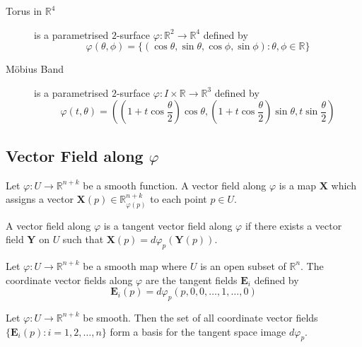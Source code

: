 \begin{description}
	\item[Torus in $\mathbb{R}^4$] is a parametrised $2$-surface $\varphi : \mathbb{R}^2 \to \mathbb{R}^4$ defined by
	\begin{equation}
		\varphi(\theta,\phi) = \{ (\cos \theta,\sin \theta,\cos \phi,\sin \phi) : \theta,\phi \in \mathbb{R} \}
	\end{equation}
\item[M\"obius Band] is a parametrised $2$-surface $\varphi : I \times \mathbb{R} \to \mathbb{R}^3$ defined by
	\begin{equation}
		\varphi(t,\theta) = \left( \left(1+t \cos \frac{\theta}{2}\right)\cos \theta, \left( 1+t \cos \frac{\theta}{2}\right) \sin \theta, t \sin\frac{\theta}{2} \right)
	\end{equation}
\end{description}

\subsection{Vector Field along $\varphi$}
\begin{definition}
	Let $\varphi : U \to \mathbb{R}^{n+k}$ be a smooth function.
	A vector field along $\varphi$ is a map $\mathbf{X}$ which assigns a vector $\mathbf{X}(p) \in \mathbb{R}_{\varphi(p)}^{n+k}$ to each point $p \in U$.
\end{definition}

\begin{definition}
	A vector field along $\varphi$ is a tangent vector field along $\varphi$ if there exists a vector field $\mathbf{Y}$ on $U$ such that $\mathbf{X}(p) = d\varphi_p(\mathbf{Y}(p))$.
\end{definition}

\begin{definition}
	Let $\varphi : U \to \mathbb{R}^{n+k}$ be a smooth map where $U$ is an open subset of $\mathbb{R}^n$.
	The coordinate vector fields along $\varphi$ are the tangent fields $\mathbf{E}_i$ defined by
	\begin{equation}
		\mathbf{E}_i(p) = d\varphi_p(p,0,0,\dots,1,\dots,0)
	\end{equation}
\end{definition}

\begin{theorem}
	Let $\varphi : U \to \mathbb{R}^{n+k}$ be smooth.
	Then the set of all coordinate vector fields $\{ \mathbf{E}_i(p) : i = 1,2,\dots,n \}$ form a basis for the tangent space image $d\varphi_p$.
\end{theorem}

